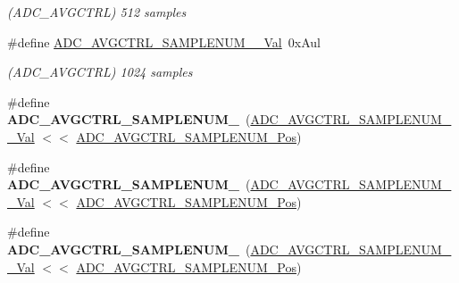 \begin{DoxyCompactItemize}
\begin{DoxyCompactList}\small\item\em (A\+D\+C\+\_\+\+A\+V\+G\+C\+T\+R\+L) 512 samples \end{DoxyCompactList}\item 
\hypertarget{group___s_a_m_l21___a_d_c_ga9afcd3280148e12b17f74ac9ef25ff1c}{}\#define \hyperlink{group___s_a_m_l21___a_d_c_ga9afcd3280148e12b17f74ac9ef25ff1c}{A\+D\+C\+\_\+\+A\+V\+G\+C\+T\+R\+L\+\_\+\+S\+A\+M\+P\+L\+E\+N\+U\+M\+\_\+\_\+\+Val}~0x\+Aul\label{group___s_a_m_l21___a_d_c_ga9afcd3280148e12b17f74ac9ef25ff1c}

\begin{DoxyCompactList}\small\item\em (A\+D\+C\+\_\+\+A\+V\+G\+C\+T\+R\+L) 1024 samples \end{DoxyCompactList}\item 
\hypertarget{group___s_a_m_l21___a_d_c_ga316d9d58fd9d42b5143b84970253173d}{}\#define {\bfseries A\+D\+C\+\_\+\+A\+V\+G\+C\+T\+R\+L\+\_\+\+S\+A\+M\+P\+L\+E\+N\+U\+M\+\_}~(\hyperlink{group___s_a_m_l21___a_d_c_ga9e70c7b0cd6dbf66fd9a26c9f664c094}{A\+D\+C\+\_\+\+A\+V\+G\+C\+T\+R\+L\+\_\+\+S\+A\+M\+P\+L\+E\+N\+U\+M\+\_\+\_\+\+Val}   $<$$<$ \hyperlink{group___s_a_m_l21___a_d_c_gae24ef894295278762f9293105f06ffb9}{A\+D\+C\+\_\+\+A\+V\+G\+C\+T\+R\+L\+\_\+\+S\+A\+M\+P\+L\+E\+N\+U\+M\+\_\+\+Pos})\label{group___s_a_m_l21___a_d_c_ga316d9d58fd9d42b5143b84970253173d}

\item 
\hypertarget{group___s_a_m_l21___a_d_c_ga6928db1958892004b3b3cd568bd3f529}{}\#define {\bfseries A\+D\+C\+\_\+\+A\+V\+G\+C\+T\+R\+L\+\_\+\+S\+A\+M\+P\+L\+E\+N\+U\+M\+\_}~(\hyperlink{group___s_a_m_l21___a_d_c_ga02a97329331932ee77e50645ba2af513}{A\+D\+C\+\_\+\+A\+V\+G\+C\+T\+R\+L\+\_\+\+S\+A\+M\+P\+L\+E\+N\+U\+M\+\_\+\_\+\+Val}   $<$$<$ \hyperlink{group___s_a_m_l21___a_d_c_gae24ef894295278762f9293105f06ffb9}{A\+D\+C\+\_\+\+A\+V\+G\+C\+T\+R\+L\+\_\+\+S\+A\+M\+P\+L\+E\+N\+U\+M\+\_\+\+Pos})\label{group___s_a_m_l21___a_d_c_ga6928db1958892004b3b3cd568bd3f529}

\item 
\hypertarget{group___s_a_m_l21___a_d_c_ga643ee966509d12fe24aa782f9a002bef}{}\#define {\bfseries A\+D\+C\+\_\+\+A\+V\+G\+C\+T\+R\+L\+\_\+\+S\+A\+M\+P\+L\+E\+N\+U\+M\+\_}~(\hyperlink{group___s_a_m_l21___a_d_c_ga2a0b01d83c38d590419a36959b3bb785}{A\+D\+C\+\_\+\+A\+V\+G\+C\+T\+R\+L\+\_\+\+S\+A\+M\+P\+L\+E\+N\+U\+M\+\_\+\_\+\+Val}   $<$$<$ \hyperlink{group___s_a_m_l21___a_d_c_gae24ef894295278762f9293105f06ffb9}{A\+D\+C\+\_\+\+A\+V\+G\+C\+T\+R\+L\+\_\+\+S\+A\+M\+P\+L\+E\+N\+U\+M\+\_\+\+Pos})\label{group___s_a_m_l21___a_d_c_ga643ee966509d12fe24aa782f9a002bef}


\end{DoxyCompactItemize}
